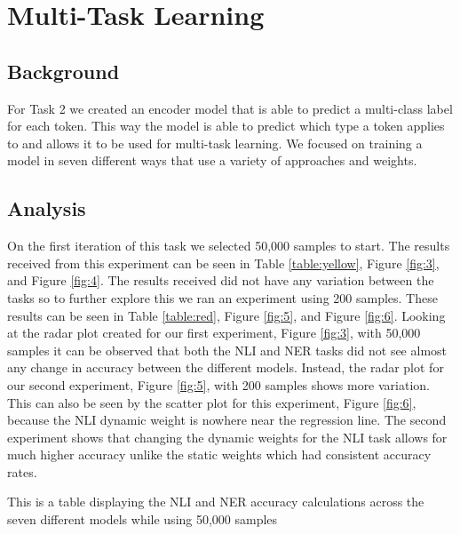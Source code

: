 \documentclass[10pt]{article}
\begin{document}
%
% 

\section{Multi-Task Learning}

\subsection{Background}
For Task 2 we created an encoder model that is able to 
predict a multi-class label for each token. This way the 
model is able to predict which type a token applies to and 
allows it to be used for multi-task learning. We focused on 
training a model in seven different ways that use a variety 
of approaches and weights.

\subsection{Analysis}
On the first iteration of this task we selected 50,000 
samples to start. The results received from this experiment 
can be seen in Table \ref{table:yellow}, Figure \ref{fig:3}, 
and Figure \ref{fig:4}. The results received did not have 
any variation between the tasks so to further explore this we ran an 
experiment using 200 samples. These results can be seen in 
Table \ref{table:red}, Figure \ref{fig:5}, and Figure \ref{fig:6}. 
Looking at the radar plot created for our first experiment, 
Figure \ref{fig:3}, with 50,000 samples it can be observed 
that both the NLI and NER tasks did not see almost any 
change in accuracy between the different models. Instead, 
the radar plot for our second experiment, Figure \ref{fig:5}, 
with 200 samples shows more variation. This can also be seen 
by the scatter plot for this experiment, Figure \ref{fig:6}, 
because the NLI dynamic weight is nowhere near the 
regression line. The second experiment shows that 
changing the dynamic weights for the NLI task allows 
for much higher accuracy unlike the static weights 
which had consistent accuracy rates.   

\begin{table}
  \centering
  \caption{This is a table displaying the NLI and NER accuracy calculations across the seven different models while using 50,000 samples}
  \label{table:yellow}
\end{table}
\end{document}
